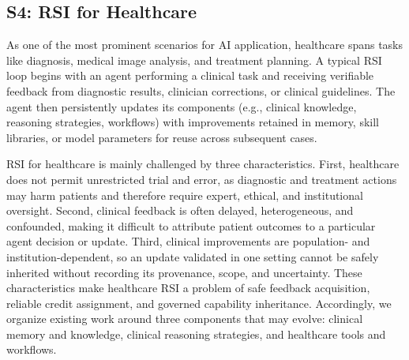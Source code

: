

\subsection{S4: RSI for Healthcare}
\label{subsec:s4}



As one of the most prominent scenarios for AI application, healthcare spans tasks like diagnosis, medical image analysis, and treatment planning. A typical RSI loop begins with an agent performing a clinical task and receiving verifiable feedback from diagnostic results, clinician corrections, or clinical guidelines. The agent then persistently updates its components (e.g., clinical knowledge, reasoning strategies, workflows) with improvements retained in memory, skill libraries, or model parameters for reuse across subsequent cases. 

RSI for healthcare is mainly challenged by three characteristics. First, healthcare does not permit unrestricted trial and error, as diagnostic and treatment actions may harm patients and therefore require expert, ethical, and institutional oversight. Second, clinical feedback is often delayed, heterogeneous, and confounded, making it difficult to attribute patient outcomes to a particular agent decision or update. Third, clinical improvements are population- and institution-dependent, so an update validated in one setting cannot be safely inherited without recording its provenance, scope, and uncertainty. These characteristics make healthcare RSI a problem of safe feedback acquisition, reliable credit assignment, and governed capability inheritance. Accordingly, we organize existing work around three components that may evolve: clinical memory and knowledge, clinical reasoning strategies, and healthcare tools and workflows.


